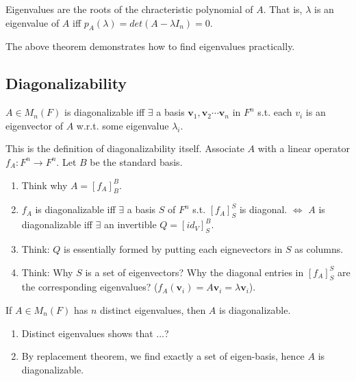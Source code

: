 \documentclass[12pt]{article}
\begin{document}
\begin{theorem}
    Eigenvalues are the roots of the chracteristic polynomial of $A$.
    That is, $\lambda$ is an eigenvalue of $A$ iff $p_A(\lambda)=det(A-\lambda I_n) = 0.$
\end{theorem}

\begin{remark}
    The above theorem demonstrates how to find eigenvalues practically.
\end{remark}


\subsection{Diagonalizability}
\begin{theorem}
$A\in M_n(F)$ is diagonalizable iff $\exists$ a basis ${\mathbf{v}_1,\mathbf{v}_2\cdots\mathbf{v}_n}$ in $F^n$ s.t. each $v_i$ is an eigenvector of $A$ w.r.t. some eigenvalue $\lambda_i$.
\end{theorem}

\begin{pf}
    This is the definition of diagonalizability itself.
    Associate $A$ with a linear operator $f_A:F^n\rightarrow F^n$. Let $B$ be the standard basis.
    \begin{enumerate}
        \item Think why $A=[f_A]^B_{B}$.
        \item $f_A$ is diagonalizable iff $\exists$ a basis $S$ of $F^n$ s.t. $[f_A]^{S}_{S}$ is diagonal.
        $\Leftrightarrow$ $A$ is diagonalizable iff $\exists$ an invertible $Q=[id_V]^{B}_{S}$.
        \item Think: $Q$ is essentially formed by putting each eignevectors in $S$ as columns. 
        \item Think: Why $S$ is a set of eigenvectors? Why the diagonal entries in $[f_A]^{S}_{S}$ are the corresponding eigenvalues? ($f_A(\mathbf{v}_i) = A\mathbf{v}_i = \lambda\mathbf{v}_i$).
    \end{enumerate}
\end{pf}

\begin{theorem}
    If $A\in M_n(F)$ has $n$ distinct eigenvalues, then $A$ is diagonalizable.
\end{theorem}

\begin{pf}
    \begin{enumerate}
        \item Distinct eigenvalues shows that ...?
        \item By replacement theorem, we find exactly a set of eigen-basis, hence $A$ is diagonalizable.
    \end{enumerate}
\end{pf}
\end{document}
